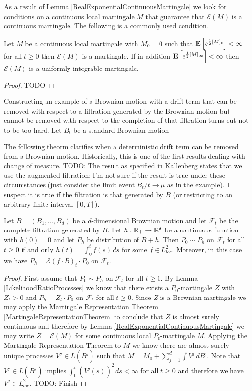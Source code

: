 As a result of Lemma \ref{RealExponentialContinuousMartingale} we look for conditions on a continuous local martingale $M$ that guarantee that $\mathcal{E}(M)$ is a continuous martingale.  The following is a commonly used condition.
\begin{lem}\label{NovikovsCondition}Let $M$ be a continuous local martingale with $M_0 = 0$ such that $\textbf{E}\left[e^{\frac{1}{2}[M]_t}\right] < \infty$ for all $t \geq 0$ then $\mathcal{E}(M)$ is a martingale.  If in addition $\textbf{E}\left[e^{\frac{1}{2}[M]_\infty}\right] < \infty$ then $\mathcal{E}(M)$ is a uniformly integrable martingale.
\end{lem}
\begin{proof}
TODO
\end{proof}

\begin{examp}Constructing an example of a Brownian motion with a drift term that can be removed with respect to a filtration generated by the Brownian motion but cannot be removed with respect to the completion of that filtration turns out not to be too hard. Let $B_t$ be a standard Brownian motion 
\end{examp}

The following theorm clarifies when a deterministic drift term can be removed from a Brownian motion.  Historically, this is one of the first results dealing with change of measure.  TODO: The result as specified in Kallenberg states that we use the augmented filtration; I'm not sure if the result is true under these circumstances (just consider the limit event $B_t/t \to \mu$ as in the example).  I suspect it is true if the filtration is that generated by $B$ (or restricting to an arbitrary finite interval $[0,T]$).
\begin{thm}\label{CameronMartin}Let $B=(B_1, \dotsc, B_d)$ be a $d$-dimensional Brownian motion and let $\mathcal{F}_t$ be the complete filtration generated by $B$. Let $h: \mathbb{R}_+ \to \mathbb{R}^d$ be a continuous function with $h(0) = 0$ and let $P_h$ be distribution of $B + h$.  Then $P_0 \sim P_h$ on $\mathcal{F}_t$ for all $t \geq 0$ if and only $h(t) = \int_0^t f(s) \, ds$ for some $f \in L^2_{loc}$.  Moreover, in this case we have $P_h = \mathcal{E}(f \cdot B)_t \cdot P_0$ on $\mathcal{F}_t$.
\end{thm}
\begin{proof}
First assume that $P_0 \sim P_h$ on $\mathcal{F}_t$ for all $t \geq 0$.  By Lemma \ref{LikelihoodRatioProcesses} we know that there exists a $P_0$-martingale $Z$ with $Z_t > 0$ and $P_h = Z_t \cdot P_0$ on $\mathcal{F}_t$ for all $t \geq 0$.  Since $Z$  is a Brownian martingale we may apply the Martingale Representation Theorem \ref{MartingaleRepresentationTheorem} to conclude that $Z$ is almost surely continuous and therefore by Lemma \ref{RealExponentialContinuousMartingale} we may write $Z = \mathcal{E}(M)$ for some continuous local $P_0$-martingale $M$.  Applying the Martingale Representation Theorem to $M$ we know there are almost surely unique processes $V^j \in L(B^j)$ such that $M = M_0 + \sum_{j=1}^d \int V^j \, dB^j$.  Note that $V^j \in L(B^j)$ implies $\int_0^t (V^j(s))^2 \, ds < \infty$ for all $t \geq 0$ and therefore we have $V^j \in L^2_{loc}$.
TODO: Finish
\end{proof}
